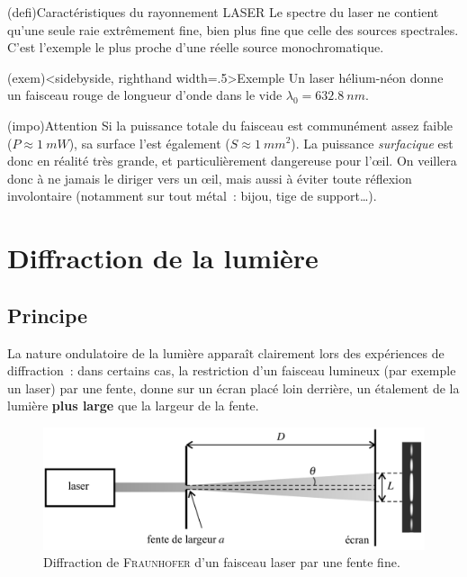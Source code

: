 \documentclass[../../main/main.tex]{subfiles}
\begin{document}
\begin{tcb}(defi){Caractéristiques du rayonnement LASER}
	Le spectre du laser ne contient qu'une seule raie extrêmement fine, bien
	plus fine que celle des sources spectrales. C'est l'exemple le plus proche
	d'une réelle source monochromatique.
\end{tcb}

\begin{tcb}(exem)<sidebyside, righthand width=.5\linewidth>{Exemple}
	Un laser hélium-néon donne un faisceau rouge de longueur d'onde dans le vide
	$\lambda_0 = \SI{632.8}{nm}$.
	\tcblower
	\begin{center}
		\pgfspectra[lines={632.8},
		axis, axis color=white, axis font color=black,
		axis ticks=4, axis unit precision=2,
		axis label text={Longueur d'onde [$\si{nm}$]},
		back=white,
		label, label position=north west,
		label before text=Spectre d'émission d'un laser \ce{He-Ne}]
		\label{fig:laser_spec}
	\end{center}
\end{tcb}
\begin{tcb}(impo){Attention}
	Si la puissance totale du faisceau est communément assez faible ($P \approx
		\SI{1}{mW}$), sa surface l'est également ($S \approx \SI{1}{mm^2}$). La
	puissance \textit{surfacique} est donc en réalité très grande, et
	particulièrement dangereuse pour l'œil. On veillera donc à ne jamais le
	diriger vers un œil, mais aussi à éviter toute réflexion involontaire
	(notamment sur tout métal~: bijou, tige de support…).
\end{tcb}

\section{Diffraction de la lumière}

\subsection{Principe}

La nature ondulatoire de la lumière apparaît clairement lors des expériences de
diffraction~: dans certains cas, la restriction d'un faisceau lumineux (par
exemple un laser) par une fente, donne sur un écran placé loin derrière, un
étalement de la lumière \textbf{plus large} que la largeur de la fente.

\begin{figure}[h]
	\centering
	\includegraphics[width=.8\linewidth]{ch1_fig5}
	\captionsetup{justification=centering}
	\caption{Diffraction de \textsc{Fraunhofer} d'un faisceau laser par une
		fente fine.}
	\label{fig:diff_las}
\end{figure}
\end{document}
